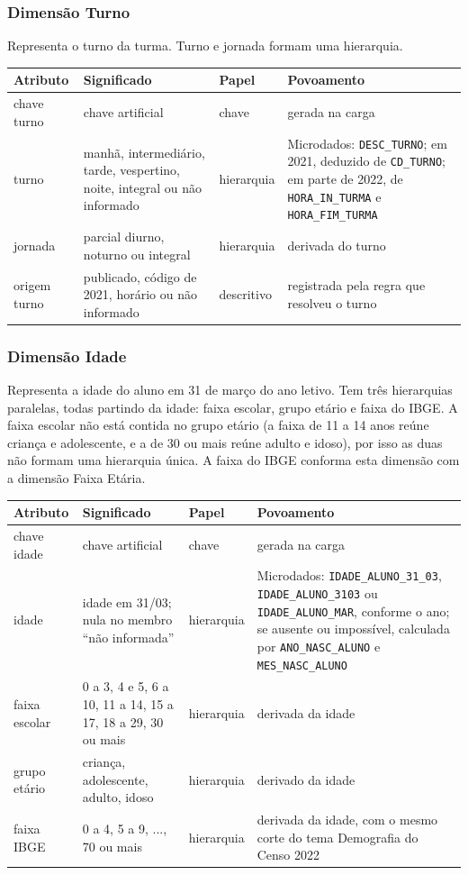 \documentclass[11pt,a4paper]{article}
\newcommand{\cod}[1]{\texttt{#1}}
\newenvironment{atributos}{%
  \small
  \begin{longtable}{>{\raggedright}p{2.6cm}>{\raggedright}p{4.6cm}>{\raggedright}p{1.9cm}>{\raggedright\arraybackslash}p{5.3cm}}
  \toprule \textbf{Atributo} & \textbf{Significado} & \textbf{Papel} & \textbf{Povoamento}\\ \midrule \endhead
  \bottomrule \endlastfoot
}{\end{longtable}\addtocounter{table}{-1}}
\begin{document}
\subsubsection{Dimensão Turno}
Representa o turno da turma. Turno e jornada formam uma hierarquia.

\begin{atributos}
chave turno & chave artificial & chave & gerada na carga \\
turno & manhã, intermediário, tarde, vespertino, noite, integral ou não informado & hierarquia & Microdados: \cod{DESC_TURNO}; em 2021, deduzido de \cod{CD_TURNO}; em parte de 2022, de \cod{HORA_IN_TURMA} e \cod{HORA_FIM_TURMA} \\
jornada & parcial diurno, noturno ou integral & hierarquia & derivada do turno \\
origem turno & publicado, código de 2021, horário ou não informado & descritivo & registrada pela regra que resolveu o turno \\
\end{atributos}

\subsubsection{Dimensão Idade}
Representa a idade do aluno em 31 de março do ano letivo. Tem três hierarquias paralelas, todas partindo da idade: faixa escolar, grupo etário e faixa do IBGE. A faixa escolar não está contida no grupo etário (a faixa de 11 a 14 anos reúne criança e adolescente, e a de 30 ou mais reúne adulto e idoso), por isso as duas não formam uma hierarquia única. A faixa do IBGE conforma esta dimensão com a dimensão Faixa Etária.

\begin{atributos}
chave idade & chave artificial & chave & gerada na carga \\
idade & idade em 31/03; nula no membro ``não informada'' & hierarquia & Microdados: \cod{IDADE_ALUNO_31_03}, \cod{IDADE_ALUNO_3103} ou \cod{IDADE_ALUNO_MAR}, conforme o ano; se ausente ou impossível, calculada por \cod{ANO_NASC_ALUNO} e \cod{MES_NASC_ALUNO} \\
faixa escolar & 0 a 3, 4 e 5, 6 a 10, 11 a 14, 15 a 17, 18 a 29, 30 ou mais & hierarquia & derivada da idade \\
grupo etário & criança, adolescente, adulto, idoso & hierarquia & derivado da idade \\
faixa IBGE & 0 a 4, 5 a 9, ..., 70 ou mais & hierarquia & derivada da idade, com o mesmo corte do tema Demografia do Censo 2022 \\
\end{atributos}
\end{document}
